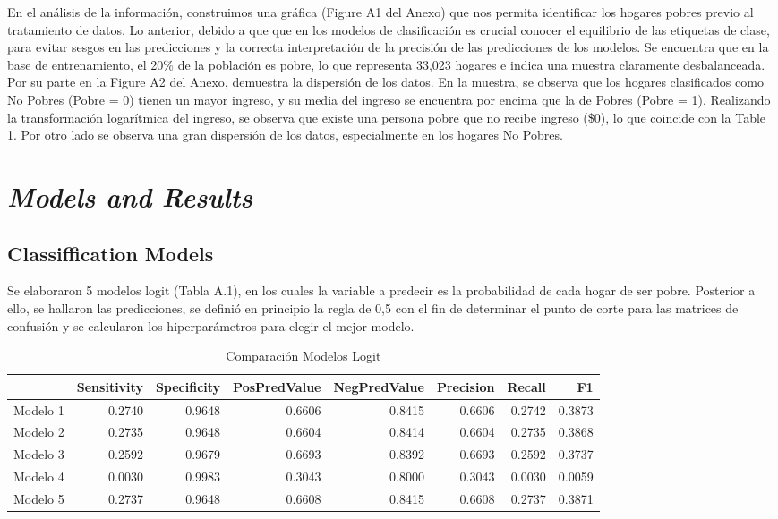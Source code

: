 \documentclass[11pt]{article}
\begin{document}
\justify 
En el análisis de la información, construimos una gráfica (Figure A1 del Anexo) que nos permita identificar los hogares pobres previo al tratamiento de datos. Lo anterior, debido a que  que en los modelos de clasificación es crucial conocer el equilibrio de las etiquetas de clase, para evitar sesgos en las predicciones y la correcta interpretación de la precisión de las predicciones de los modelos. Se encuentra que en la base de entrenamiento, el 20\% de la población es pobre, lo que representa 33,023 hogares e indica una muestra claramente desbalanceada. Por su parte en la Figure A2 del Anexo, demuestra la dispersión de los datos. En la muestra, se observa que los hogares clasificados como No Pobres (Pobre = 0) tienen un mayor ingreso, y su media del ingreso se encuentra por encima que la de Pobres (Pobre = 1). Realizando la transformación logarítmica del ingreso, se observa que existe una persona pobre que no recibe ingreso (\$0), lo que coincide con la Table 1. Por otro lado se observa una gran dispersión de los datos, especialmente en los hogares No Pobres. 

\section{\bf\emph {Models and Results}}\label{sec:sec3}

\subsection{Classiffication Models}

\justify 
 Se elaboraron 5 modelos logit (Tabla A.1), en los cuales la variable a predecir es la probabilidad de cada hogar de ser pobre. Posterior a ello, se hallaron las predicciones, se definió en principio la regla de 0,5 con el fin de determinar el punto de corte para las matrices de confusión y se calcularon los hiperparámetros para elegir el mejor modelo. 
\begin{table}[ht]
\centering
\caption{Comparación Modelos Logit}
\begin{tabular}{rrrrrrrr}
 \hline
 & Sensitivity & Specificity & PosPredValue & NegPredValue & Precision & Recall & F1 \\ 
  \hline
Modelo 1 & 0.2740 & 0.9648 & 0.6606 & 0.8415 & 0.6606 & 0.2742 & {\color{red}0.3873} \\ 
  Modelo 2 & 0.2735 & 0.9648 & 0.6604 & 0.8414 & 0.6604 & 0.2735 & 0.3868 \\ 
  Modelo 3 & 0.2592 & 0.9679 & 0.6693 & 0.8392 & 0.6693 & 0.2592 & 0.3737 \\ 
  Modelo 4 & 0.0030 & 0.9983 & 0.3043 & 0.8000 & 0.3043 & 0.0030 & 0.0059 \\ 
  Modelo 5 & 0.2737 & 0.9648 & 0.6608 & 0.8415 & 0.6608 & 0.2737 & 0.3871 \\ 
   \hline
\end{tabular}
\end{table}
\end{document}
